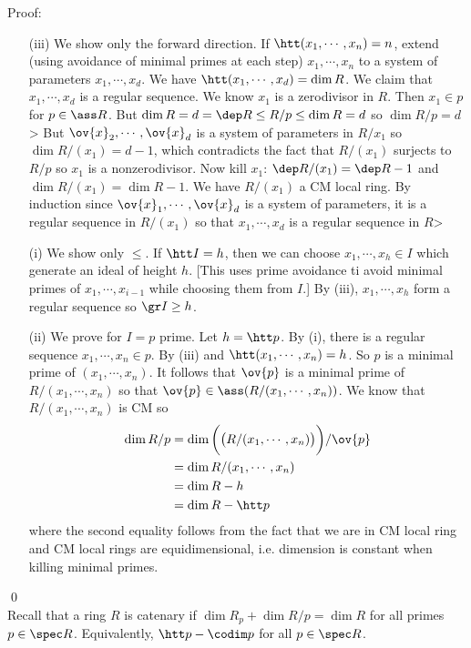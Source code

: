 \noindent Proof:
\begin{enumerate}
\item[(iii)] We show only the forward direction. If $\htt(x_1,\cdots,x_n)=n$, extend (using avoidance of minimal primes at each step) $x_1,\cdots,x_n$ to a system of parameters $x_1,\cdots,x_d$. We have $\htt(x_1,\cdots,x_d)=\dim R$. We claim that $x_1,\cdots,x_d$ is a regular sequence. We know $x_1$ is a zerodivisor in $R$. Then $x_1 \in p$ for $p \in \ass R$. But $\dim R=d=\dep R \leq R/p \leq \dim R=d$ so $\dim R/p=d$> But $\ov{x}_2,\cdots,\ov{x}_d$ is a system of parameters in $R/x_1$ so $\dim R/(x_1)=d-1$, which contradicts the fact that $R/(x_1)$ surjects to $R/p$ so $x_1$ is a nonzerodivisor. Now kill $x_1$: $\dep R/(x_1)=\dep R-1$ and $\dim R/(x_1)=\dim R-1$. We have $R/(x_1)$ a CM local ring. By induction since $\ov{x}_1,\cdots,\ov{x}_d$ is a system of parameters, it is a regular sequence in $R/(x_1)$ so that $x_1,\cdots,x_d$ is a regular sequence in $R$> 

\item[(i)] We show only $\leq$. If $\htt I=h$, then we can choose $x_1,\cdots,x_h \in I$ which generate an ideal of height $h$. [This uses prime avoidance ti avoid minimal primes of $x_1,\cdots,x_{i-1}$ while choosing them from $I$.] By (iii), $x_1,\cdots,x_h$ form a regular sequence so $\gr I \geq h$.

\item[(ii)] We prove for $I=p$ prime. Let $h=\htt p$. By (i), there is a regular sequence $x_1,\cdots,x_n \in p$. By (iii) and $\htt(x_1,\cdots,x_n)=h$. So $p$ is a minimal prime of $(x_1,\cdots,x_n)$. It follows that $\ov{p}$ is a minimal prime of $R/(x_1,\cdots,x_n)$ so that $\ov{p} \in \ass(R/(x_1,\cdots,x_n))$. We know that $R/(x_1,\cdots,x_n)$ is CM so 
\[
\begin{split}
\dim R/p&=\dim\bigg(\big(R/(x_1,\cdots,x_n)\big)\bigg)/\ov{p} \\
&=\dim R/(x_1,\cdots,x_n) \\
&=\dim R-h \\
&=\dim R-\htt p
\end{split}
\]
where the second equality follows from the fact that we are in CM local ring and CM local rings are equidimensional, i.e. dimension is constant when killing minimal primes. 
\end{enumerate}
\qed \\

Recall that a ring $R$ is catenary if $\dim R_p+\dim R/p=\dim R$ for all primes $p \in \spec R$. Equivalently, $\htt p-\codim p$ for all $p \in \spec R$. 

